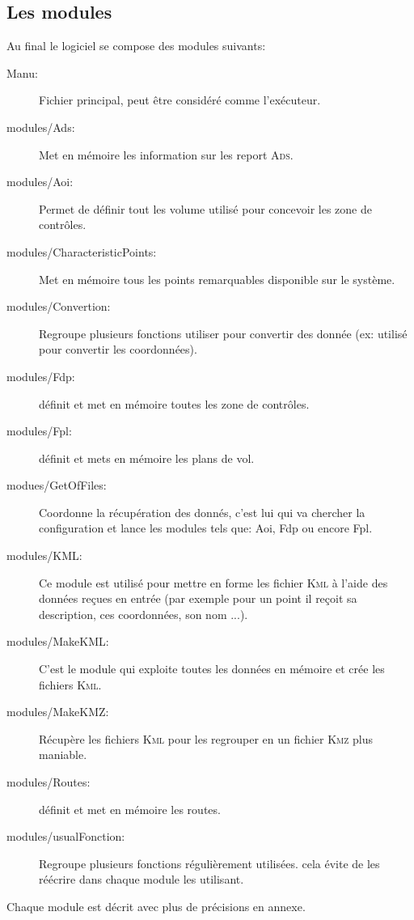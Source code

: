     \subsection{Les modules}
Au final le logiciel se compose des modules suivants:
\begin{description}
\item[Manu:] Fichier principal, peut être considéré comme l'exécuteur. 
\item[modules/Ads:] Met en mémoire les information sur les report \textsc{Ads}. 
\item[modules/Aoi:] Permet de définir tout les volume utilisé pour concevoir les zone de contrôles. 
\item[modules/CharacteristicPoints:] Met en mémoire tous les points remarquables disponible sur le système. 
\item[modules/Convertion:] Regroupe plusieurs fonctions utiliser pour convertir des donnée (ex: utilisé pour convertir les coordonnées). 
\item[modules/Fdp:] définit et met en mémoire toutes les zone de contrôles. 
\item[modules/Fpl:] définit et mets en mémoire les plans de vol. 
\item[modues/GetOfFiles:] Coordonne la récupération des donnés, c'est lui qui va chercher la configuration et lance les modules tels que: Aoi, Fdp ou encore Fpl. 
\item[modules/KML:] Ce module est utilisé pour mettre en forme les fichier \textsc{Kml} à l'aide des données reçues en entrée (par exemple pour un point il reçoit sa description, ces coordonnées, son nom ...). 
\item[modules/MakeKML:] C'est le module qui exploite toutes les données en mémoire et crée les fichiers \textsc{Kml}. 
\item[modules/MakeKMZ:] Récupère les fichiers \textsc{Kml} pour les regrouper en un fichier \textsc{Kmz} plus maniable. 
\item[modules/Routes:] définit et met en mémoire les routes. 
\item[modules/usualFonction:] Regroupe plusieurs fonctions régulièrement utilisées. cela évite de les réécrire dans chaque module les utilisant. 
\end{description}
Chaque module est décrit avec plus de précisions en annexe.

